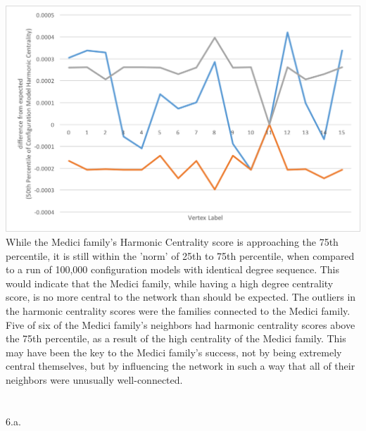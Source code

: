 \documentclass[11pt, oneside]{article}   	%
\begin{document}
\includegraphics{picture1}\\
\indent While the Medici family's Harmonic Centrality score is approaching the 75th percentile, it is still within the 'norm' of 25th to 75th percentile, when compared to a run of 100,000 configuration models with identical degree sequence.  This would indicate that the Medici family, while having a high degree centrality score, is no more central to the network than should be expected.  The outliers in the harmonic centrality scores were the families connected to the Medici family.  Five of six of the Medici family's neighbors had harmonic centrality scores above the 75th percentile, as a result of the high centrality of the Medici family.  This may have been the key to the Medici family's success, not by being extremely central themselves, but by influencing the network in such a way that all of their neighbors were unusually well-connected.\\\\\\
6.a.\\
\end{document}
